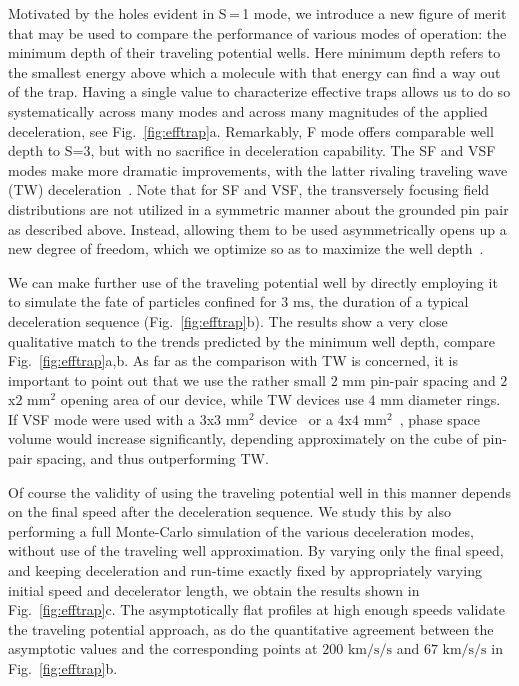 \documentclass[%
 reprint,
 amsmath,amssymb,
 aps,
prl,
]{revtex4-1}
\begin{document}
Motivated by the holes evident in S\,=\,1 mode, we introduce a new figure of merit that may be used to compare the performance of various modes of operation: the minimum depth of their traveling potential wells.
Here minimum depth refers to the smallest energy above which a molecule with that energy can find a way out of the trap.
Having a single value to characterize effective traps allows us to do so systematically across many modes and across many magnitudes of the applied deceleration, see Fig.~\ref{fig:efftrap}a. 
Remarkably, F mode offers comparable well depth to S=3, but with no sacrifice in deceleration capability. 
The SF and VSF modes make more dramatic improvements, with the latter rivaling traveling wave (TW) deceleration~\cite{Osterwalder2010}. 
Note that for SF and VSF, the transversely focusing field distributions are not utilized in a symmetric manner about the grounded pin pair as described above. 
Instead, allowing them to be used asymmetrically opens up a new degree of freedom, which we optimize so as to maximize the well depth~\cite{ssm}.

We can make further use of the traveling potential well by directly employing it to simulate the fate of particles confined for $3\text{ ms}$, the duration of a typical deceleration sequence (Fig.~\ref{fig:efftrap}b). 
The results show a very close qualitative match to the trends predicted by the minimum well depth, compare Fig.~\ref{fig:efftrap}a,b.
As far as the comparison with TW is concerned, it is important to point out that we use the rather small $2\text{ mm}$ pin-pair spacing and $2$x$2\text{ mm}^2$ opening area of our device, while TW devices use $4\text{ mm}$ diameter rings.
If VSF mode were used with a $3$x$3\text{ mm}^2$ device~\cite{Scharfenberg2009} or a $4$x$4\text{ mm}^2$~\cite{VandeMeerakker2005}, phase space volume would increase significantly, depending approximately on the cube of pin-pair spacing, and thus outperforming TW. 

Of course the validity of using the traveling potential well in this manner depends on the final speed after the deceleration sequence.
We study this by also performing a full Monte-Carlo simulation of the various deceleration modes, without use of the traveling well approximation.
By varying only the final speed, and keeping deceleration and run-time exactly fixed by appropriately varying initial speed and decelerator length, we obtain the results shown in Fig.~\ref{fig:efftrap}c. 
The asymptotically flat profiles at high enough speeds validate the traveling potential approach, as do the quantitative agreement between the asymptotic values and the corresponding points at $200\text{ km/s/s}$ and $67\text{ km/s/s}$ in Fig.~\ref{fig:efftrap}b. 
\end{document}
